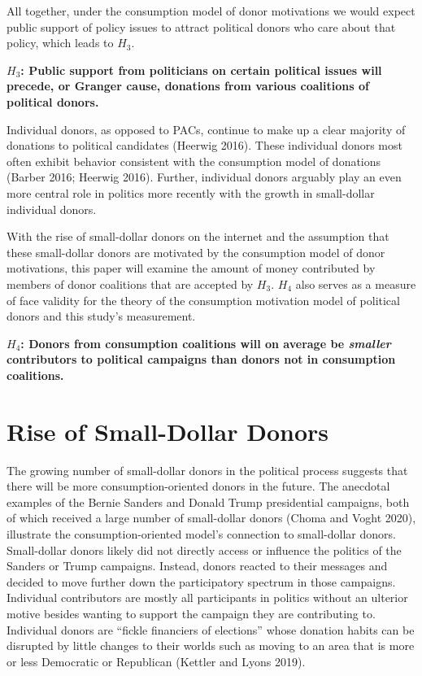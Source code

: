 \documentclass[12pt,]{article}
\begin{document}
All together, under the consumption model of donor motivations we would
expect public support of policy issues to attract political donors who
care about that policy, which leads to \(H_{3}\).

\textbf{\(H_{3}\): Public support from politicians on certain political
issues will precede, or Granger cause, donations from various coalitions
of political donors.}

Individual donors, as opposed to PACs, continue to make up a clear
majority of donations to political candidates (Heerwig 2016). These
individual donors most often exhibit behavior consistent with the
consumption model of donations (Barber 2016; Heerwig 2016). Further,
individual donors arguably play an even more central role in politics
more recently with the growth in small-dollar individual donors.

With the rise of small-dollar donors on the internet and the assumption
that these small-dollar donors are motivated by the consumption model of
donor motivations, this paper will examine the amount of money
contributed by members of donor coalitions that are accepted by
\(H_{3}\). \(H_{4}\) also serves as a measure of face validity for the
theory of the consumption motivation model of political donors and this
study's measurement.

\textbf{\(H_{4}\): Donors from consumption coalitions will on average be
\emph{smaller} contributors to political campaigns than donors not in
consumption coalitions.}

\hypertarget{rise-of-small-dollar-donors}{%
\section{Rise of Small-Dollar
Donors}\label{rise-of-small-dollar-donors}}

The growing number of small-dollar donors in the political process
suggests that there will be more consumption-oriented donors in the
future. The anecdotal examples of the Bernie Sanders and Donald Trump
presidential campaigns, both of which received a large number of
small-dollar donors (Choma and Voght 2020), illustrate the
consumption-oriented model's connection to small-dollar donors.
Small-dollar donors likely did not directly access or influence the
politics of the Sanders or Trump campaigns. Instead, donors reacted to
their messages and decided to move further down the participatory
spectrum in those campaigns. Individual contributors are mostly all
participants in politics without an ulterior motive besides wanting to
support the campaign they are contributing to. Individual donors are
``fickle financiers of elections'' whose donation habits can be
disrupted by little changes to their worlds such as moving to an area
that is more or less Democratic or Republican (Kettler and Lyons 2019).
\end{document}
